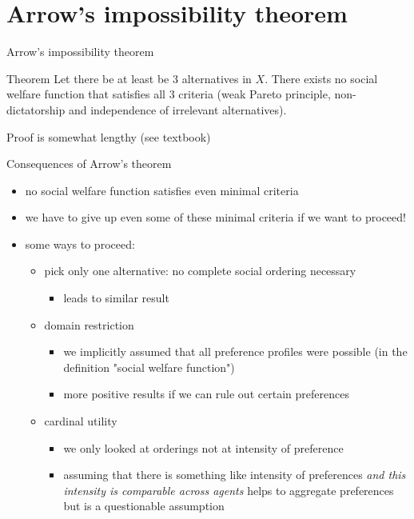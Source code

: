 \documentclass[bigger]{beamer}
\begin{document}
\section{Arrow's  impossibility theorem}
\label{sec:org95f26a1}
\begin{frame}[label={sec:orgdc770d1}]{Arrow's impossibility theorem}
\begin{block}{Theorem}
Let there be at least be 3 alternatives in \(X\). There exists no social welfare function that satisfies all 3 criteria (weak Pareto principle, non-dictatorship and independence of irrelevant alternatives). 
\end{block}

Proof is somewhat lengthy (see textbook)
\end{frame}
\begin{frame}[label={sec:org2dc464f}]{Consequences  of Arrow's theorem}
\begin{itemize}
\item no social welfare function satisfies even minimal criteria
\item we have to give up even some of these minimal criteria if we want to proceed!
\item some ways to proceed:
\begin{itemize}
\item pick only one alternative: no complete social ordering necessary
\begin{itemize}
\item leads to similar result
\end{itemize}
\item domain restriction
\begin{itemize}
\item we implicitly assumed that all preference profiles were possible (in the definition "social welfare function")
\item more positive results if we can rule out certain preferences
\end{itemize}
\item cardinal utility
\begin{itemize}
\item we only looked at orderings not at intensity of preference
\item assuming that there is something like intensity of preferences \emph{and this intensity is comparable across agents} helps to aggregate preferences but is a questionable assumption
\end{itemize}
\end{itemize}
\end{itemize}
\end{frame}
\end{document}

